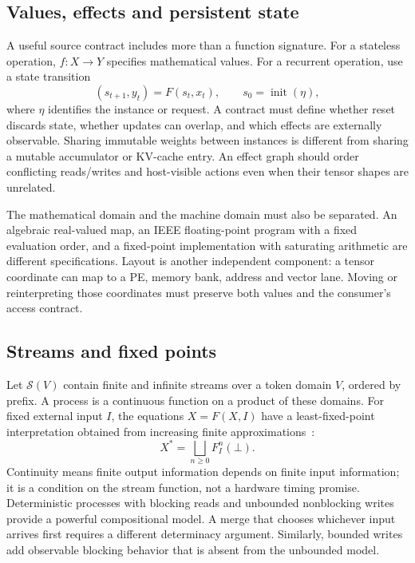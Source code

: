 \documentclass[final,3p,times,authoryear]{elsarticle}
\begin{document}
\subsection{Values, effects and persistent state}
A useful source contract includes more than a function signature. For a stateless operation, $f:X\to Y$ specifies mathematical values. For a recurrent operation, use a state transition
\begin{equation}
 (s_{t+1},y_t)=F(s_t,x_t),\qquad s_0=\operatorname{init}(\eta),
\end{equation}
where $\eta$ identifies the instance or request. A contract must define whether reset discards state, whether updates can overlap, and which effects are externally observable. Sharing immutable weights between instances is different from sharing a mutable accumulator or KV-cache entry. An effect graph should order conflicting reads/writes and host-visible actions even when their tensor shapes are unrelated.

The mathematical domain and the machine domain must also be separated. An algebraic real-valued map, an IEEE floating-point program with a fixed evaluation order, and a fixed-point implementation with saturating arithmetic are different specifications. Layout is another independent component: a tensor coordinate can map to a PE, memory bank, address and vector lane. Moving or reinterpreting those coordinates must preserve both values and the consumer's access contract.

\subsection{Streams and fixed points}
Let $\mathcal S(V)$ contain finite and infinite streams over a token domain $V$, ordered by prefix. A process is a continuous function on a product of these domains. For fixed external input $I$, the equations $X=F(X,I)$ have a least-fixed-point interpretation obtained from increasing finite approximations~\citep{kahn1974,leeparks1995}:
\begin{equation}
 X^*=\bigsqcup_{n\ge0} F_I^n(\bot).
\end{equation}
Continuity means finite output information depends on finite input information; it is a condition on the stream function, not a hardware timing promise. Deterministic processes with blocking reads and unbounded nonblocking writes provide a powerful compositional model. A merge that chooses whichever input arrives first requires a different determinacy argument. Similarly, bounded writes add observable blocking behavior that is absent from the unbounded model.
\end{document}
